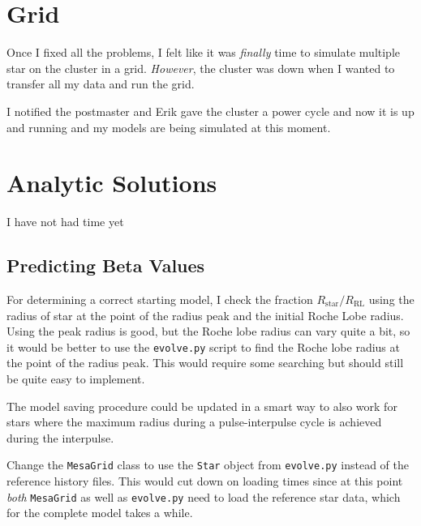 \documentclass[a4paper,10pt]{article}
\begin{document}
\section{Grid}
Once I fixed all the problems, I felt like it was \emph{finally} time to simulate multiple star on the cluster in a grid. \emph{However}, the cluster was down when I wanted to transfer all my data and run the grid. 

I notified the postmaster and Erik gave the cluster a power cycle and now it is up and running and my models are being simulated at this moment.


\section{Analytic Solutions}
I have not had time yet
\subsection{Predicting Beta Values}

\label{sec:improvements}
\begin{enumd}
    \item For determining a correct starting model, I check the fraction \(R_\text{star} / R_\text{RL}\) using the radius of star at the point of the radius peak and the initial Roche Lobe radius. Using the peak radius is good, but the Roche lobe radius can vary quite a bit, so it would be better to use the \lstinline[style=output, breaklines=true]|evolve.py| script to find the Roche lobe radius at the point of the radius peak. This would require some searching but should still be quite easy to implement.
    \item The model saving procedure could be updated in a smart way to also work for stars where the maximum radius during a pulse-interpulse cycle is achieved during the interpulse.
    \item Change the \lstinline[style=output, breaklines=true]|MesaGrid| class to use the \lstinline[style=output, breaklines=true]|Star| object from \lstinline[style=output, breaklines=true]|evolve.py| instead of the reference history files. This would cut down on loading times since at this point \emph{both} \lstinline[style=output, breaklines=true]|MesaGrid| as well as \lstinline[style=output, breaklines=true]|evolve.py| need to load the reference star data, which for the complete model takes a while.
\end{enumd}


\end{document}
